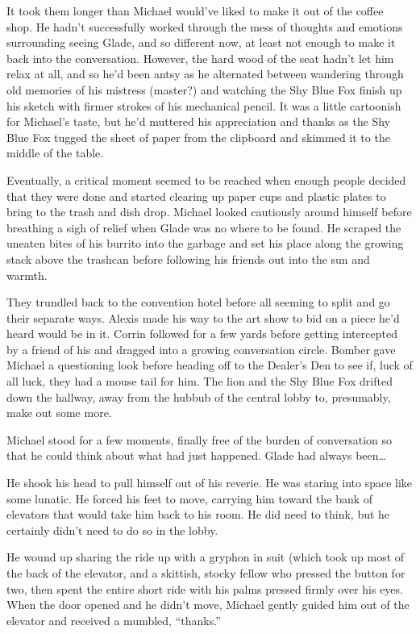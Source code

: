 \documentclass[12pt,letterpaper,oneside]{memoir}
\begin{document}
  It took them longer than Michael would've liked to make it out of the coffee shop.  He hadn't successfully worked through the mess of thoughts and emotions surrounding seeing Glade, and so different now, at least not enough to make it back into the conversation.  However, the hard wood of the seat hadn't let him relax at all, and so he'd been antsy as he alternated between wandering through old memories of his mistress (master?) and watching the Shy Blue Fox finish up his sketch with firmer strokes of his mechanical pencil.  It was a little cartoonish for Michael's taste, but he'd muttered his appreciation and thanks as the Shy Blue Fox tugged the sheet of paper from the clipboard and skimmed it to the middle of the table.

  Eventually, a critical moment seemed to be reached when enough people decided that they were done and started clearing up paper cups and plastic plates to bring to the trash and dish drop.  Michael looked cautiously around himself before breathing a sigh of relief when Glade was no where to be found.  He scraped the uneaten bites of his burrito into the garbage and set his place along the growing stack above the trashcan before following his friends out into the sun and warmth.

  They trundled back to the convention hotel before all seeming to split and go their separate ways. Alexis made his way to the art show to bid on a piece he'd heard would be in it.  Corrin followed for a few yards before getting intercepted by a friend of his and dragged into a growing conversation circle.  Bomber gave Michael a questioning look before heading off to the Dealer's Den to see if, luck of all luck, they had a mouse tail for him.  The lion and the Shy Blue Fox drifted down the hallway, away from the hubbub of the central lobby to, presumably, make out some more.

  Michael stood for a few moments, finally free of the burden of conversation so that he could think about what had just happened.  Glade had always been\ldots{}

  He shook his head to pull himself out of his reverie.  He was staring into space like some lunatic.  He forced his feet to move, carrying him toward the bank of elevators that would take him back to his room.  He did need to think, but he certainly didn't need to do so in the lobby.

  He wound up sharing the ride up with a gryphon in suit (which took up most of the back of the elevator, and a skittish, stocky fellow who pressed the button for two, then spent the entire short ride with his palms pressed firmly over his eyes.  When the door opened and he didn't move, Michael gently guided him out of the elevator and received a mumbled, ``thanks.''
\end{document}
